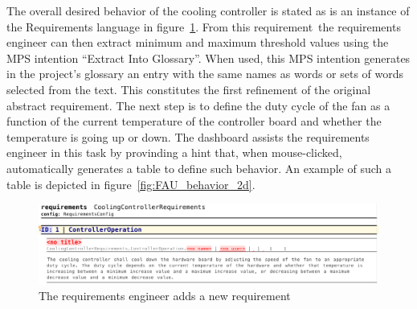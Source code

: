The overall desired behavior of the cooling controller is stated as is an instance of the
\textsf{Requirements} language in figure~\ref{fig:new_req}. From this
requirement the requirements engineer can then extract minimum and maximum
threshold values using the MPS intention ``Extract Into Glossary''. When used, this MPS intention generates in the
project's glossary an entry with the same names as words or sets of words
selected from the text. This constitutes the first refinement of the original
abstract requirement. The next step is to define the duty cycle of the fan as a
function of the current temperature of the controller board and whether the temperature is going
up or down. The dashboard assists the requirements engineer in this task by
provinding a hint that, when mouse-clicked, automatically generates a table to
define such behavior. An example of such a table is depicted in
figure~\ref{fig:FAU_behavior_2d}.
 \vspace{-.5cm}
\begin{figure}[!h]
\centering 
\includegraphics[width=1\textwidth]{./figures/textReqIncomplete.png}
\vspace{-.7cm}
\caption{The requirements engineer adds a new requirement}
\label{fig:new_req}
\vspace{-.7cm}
\end{figure}

